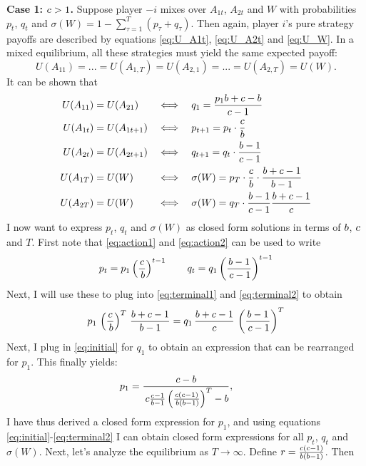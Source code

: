 \documentclass[main.tex]{subfiles}
\begin{document}
\textbf{Case 1: $c>1$.}
Suppose player $-i$ mixes over $A_{1t}$, $A_{2t}$ and $W$ with probabilities $p_{t}$, $q_{t}$ and $\sigma(W)=1-\sum_{\tau=1}^{T}(p_\tau+q_\tau)$. Then again, player $i$'s pure strategy payoffs are described by equations \ref{eq:U_A1t}, \ref{eq:U_A2t} and \ref{eq:U_W}.
In a mixed equilibrium, all these strategies must yield the same expected payoff:
\[
U(A_{11})=...=U(A_{1,T})=U(A_{2,1})=...=U(A_{2,T})=U(W).
\]
It can be shown that 
\begin{align}
U(A_{11}) &= U(A_{21}) 
&&\Longleftrightarrow \quad q_1 = \frac{p_1 \bparam +\cparam-\bparam}{\cparam-1}
\label{eq:initial} \\
%
U(A_{1t}) &= U(A_{1t+1}) 
&&\Longleftrightarrow \quad p_{t+1} = p_t\cdot\frac{c}{b}
\label{eq:action1} \\
%
U(A_{2t}) &= U(A_{2t+1}) 
&&\Longleftrightarrow \quad q_{t+1} = q_t\cdot\frac{b-1}{c-1}
\label{eq:action2} \\
%
U(A_{1T}) &= U(W) 
&&\Longleftrightarrow \quad \sigma(W) = p_T\cdot\frac{c}{b}\cdot\frac{b+c-1}{b-1}
\label{eq:terminal1} \\
%
U(A_{2T}) &= U(W) 
&&\Longleftrightarrow \quad \sigma(W) = q_T \cdot \frac{b-1}{c-1}\frac{b+c-1}{c}
\label{eq:terminal2}
\end{align}
I now want to express $p_t$, $q_t$ and $\sigma(W)$ as closed form solutions in terms of $b$, $c$ and $T$. First note that \ref{eq:action1} and \ref{eq:action2} can be used to write
\[
p_t = p_1 \left(\frac{c}{\,b}\right)^{t-1} \qquad 
q_t = q_1 \left(\frac{b-1}{\,c-1}\right)^{t-1}
\]
Next, I will use these to plug into \ref{eq:terminal1} and \ref{eq:terminal2} to obtain
\[
p_1 \, \left(\frac{c}{\,b}\right)^{T} \, \frac{b+c-1}{b-1} =  q_1 \, \frac{b+c-1}{c} \, \left(\frac{b-1}{\,c-1}\right)^{T}
\]
Next, I plug in \ref{eq:initial} for $q_1$ to obtain an expression that can be rearranged for $p_1$. This finally yields:
\begin{equation}
   p_1 = \frac{c-b}{\,c\frac{c-1}{b-1}\left(\frac{c(c-1)}{\,b(b-1)}\right)^{T}-b}, \qquad
   \label{eq:p_deriv}
\end{equation}
I have thus derived a closed form expression for $p_1$, and using equations \ref{eq:initial}-\ref{eq:terminal2} I can obtain closed form expressions for all $p_t$, $q_t$ and $\sigma(W)$. Next, let's analyze the equilibrium as $T\to\infty$. Define $r=\frac{c(c-1)}{b(b-1)}$. Then
\end{document}
